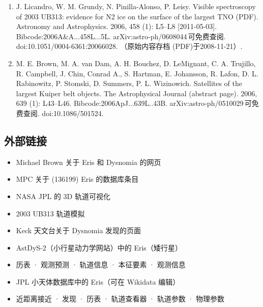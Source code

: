 \begin{enumerate}
\item J. Licandro, W. M. Grundy, N. Pinilla-Alonso, P. Leisy. Visible spectroscopy of 2003 UB313: evidence for N2 ice on the surface of the largest TNO (PDF). Astronomy and Astrophysics. 2006, 458 (1): L5–L8 [2011-05-03]. Bibcode:2006A&A...458L...5L. arXiv:astro-ph/0608044 可免费查阅. doi:10.1051/0004-6361:20066028. （原始内容存档 (PDF)于2008-11-21）.
\item M. E. Brown, M. A. van Dam, A. H. Bouchez, D. LeMignant, C. A. Trujillo, R. Campbell, J. Chin, Conrad A., S. Hartman, E. Johansson, R. Lafon, D. L. Rabinowitz, P. Stomski, D. Summers, P. L. Wizinowich. Satellites of the largest Kuiper belt objects. The Astrophysical Journal (abstract page). 2006, 639 (1): L43–L46. Bibcode:2006ApJ...639L..43B. arXiv:astro-ph/0510029 可免费查阅. doi:10.1086/501524.
\end{enumerate}
\subsection{外部链接}
\begin{itemize}
\item Michael Brown 关于 Eris 和 Dysnomia 的网页  
\item MPC 关于 (136199) Eris 的数据库条目  
\item NASA JPL 的 3D 轨道可视化  
\item 2003 UB313 轨道模拟  
\item Keck 天文台关于 Dysnomia 发现的页面  
\item AstDyS-2（小行星动力学网站）中的 Eris（矮行星）  
\item 历表 · 观测预测 · 轨道信息 · 本征要素 · 观测信息  
\item JPL 小天体数据库中的 Eris（可在 Wikidata 编辑）  
\item 近距离接近 · 发现 · 历表 · 轨道查看器 · 轨道参数 · 物理参数
\end{itemize}












